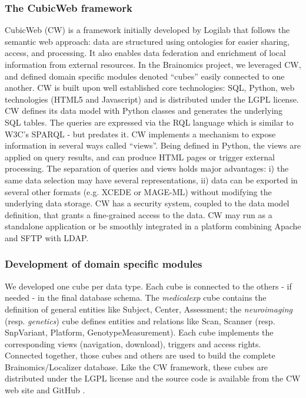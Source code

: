 \documentclass[review]{elsarticle}
\begin{document}
\subsubsection{The CubicWeb framework} CubicWeb (CW) is a framework initially developed by Logilab that follows the semantic web approach: data are structured using ontologies for easier sharing, access, and processing. It also enables data federation and enrichment of local information from external resources. In the Brainomics project, we leveraged CW, and defined domain specific modules denoted ``cubes'' easily connected to one another. CW is built upon well established core technologies: SQL, Python, web technologies (HTML5 and Javascript) and is distributed under the LGPL license. CW defines its data model with Python classes and generates the underlying SQL tables. The queries are expressed via the RQL language which is similar to W3C's SPARQL - but predates it. CW implements a mechanism to expose information in several ways called ``views''. Being defined in Python, the views are applied on query results, and can produce HTML pages or trigger external processing. The separation of queries and views holds major advantages: i) the same data selection may have several representations, ii) data can be exported in several other formats (e.g. XCEDE or MAGE-ML) without modifying the underlying data storage. CW has a security system, coupled to the data model definition, that grants a fine-grained access to the data. CW may run as a standalone application or be smoothly integrated in a platform combining Apache and SFTP with LDAP.


\subsubsection{Development of domain specific modules}

We developed one cube per data type. Each cube is connected to the others - if needed - in the final database schema. The \textit{medicalexp} cube contains the definition of general entities like Subject, Center, Assessment; the \textit{neuroimaging} (resp. \textit{genetics}) cube defines entities and relations like Scan, Scanner (resp. SnpVariant, Platform, GenotypeMeasurement). Each cube implements the corresponding views (navigation, download), triggers and access rights. Connected together, those cubes and others are used to build the complete Brainomics/Localizer database. Like the CW framework, these cubes are distributed under the LGPL license and the source code is available from the CW web site \cite{CubicWeb} and GitHub \cite{Localizer}.
\end{document}
